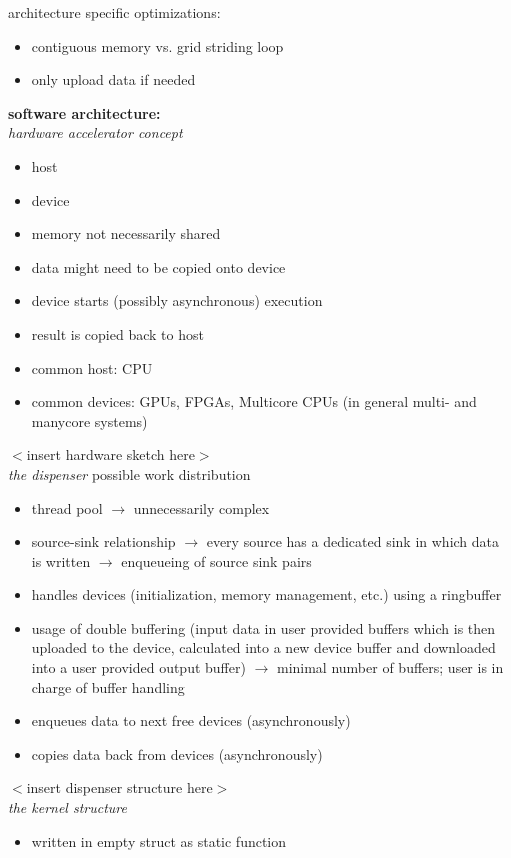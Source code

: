 \documentclass[a4paper]{article}
\begin{document}
{architecture specific optimizations:
\begin{itemize}
	\item contiguous memory vs. grid striding loop
	\item only upload data if needed
\end{itemize}
\textbf{software architecture:}\\
\textit{hardware accelerator concept}
\begin{itemize}
	\item host
	\item device
	\item memory not necessarily shared
	\item data might need to be copied onto device
	\item device starts (possibly asynchronous) execution
	\item result is copied back to host
	\item common host: CPU
	\item common devices: GPUs, FPGAs, Multicore CPUs (in general multi- and manycore systems)
\end{itemize}
$<$insert hardware sketch here$>$\\
\textit{the dispenser}
possible work distribution
\begin{itemize}
	\item thread pool $\rightarrow$ unnecessarily complex
	\item source-sink relationship $\rightarrow$ every source has a dedicated sink in which data is written $\rightarrow$ enqueueing of source sink pairs
\end{itemize}
\begin{itemize}
	\item handles devices (initialization, memory management, etc.) using a ringbuffer
	\item usage of double buffering (input data in user provided buffers which is then uploaded to the device, calculated into a new device buffer and downloaded into a user provided output buffer) $\rightarrow$ minimal number of buffers; user is in charge of buffer handling
	\item enqueues data to next free devices (asynchronously)
	\item copies data back from devices (asynchronously)
\end{itemize}
$<$insert dispenser structure here$>$\\
\textit{the kernel structure}
\begin{itemize}
	\item written in empty struct as static function

\end{itemize}}
\end{document}
